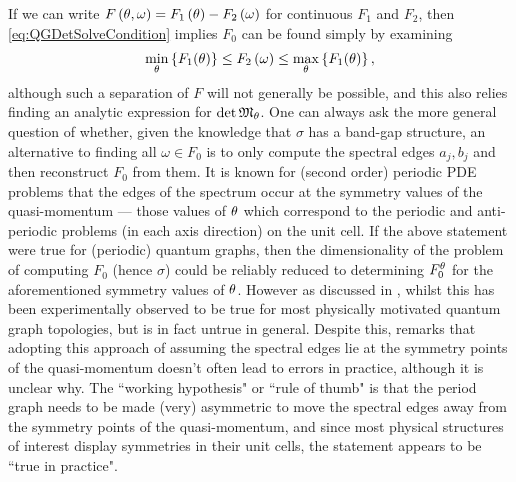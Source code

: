 If we can write $F\left( \theta,\omega \right) = F_1\left( \theta \right) - F_2\left( \omega \right)$ for continuous $F_1$ and $F_2$, then \eqref{eq:QGDetSolveCondition} implies $F_0$ can be found simply by examining
\begin{align*}
	\min_{\theta}\left\{ F_1(\theta) \right\} \leq F_2\left( \omega \right) \leq \max_{\theta}\left\{ F_1(\theta) \right\},
\end{align*} 
although such a separation of $F$ will not generally be possible, and this also relies finding an analytic expression for $\det\mathfrak{M}_\theta$.
One can always ask the more general question of whether, given the knowledge that $\sigma$ has a band-gap structure, an alternative to finding all $\omega\in F_0$ is to only compute the spectral edges $a_j, b_j$ and then reconstruct $F_0$ from them.
It is known for (second order) periodic PDE problems that the edges of the spectrum occur at the symmetry values of the quasi-momentum --- those values of $\theta$ which correspond to the periodic and anti-periodic problems (in each axis direction) on the unit cell.
If the above statement were true for (periodic) quantum graphs, then the dimensionality of the problem of computing $F_0$ (hence $\sigma$) could be reliably reduced to determining $F_0^\theta$ for the aforementioned symmetry values of $\theta$.
However as discussed in \cite[Chapter 4.6]{berkolaiko2013introduction}, whilst this has been experimentally observed to be true for most physically motivated quantum graph topologies, but is in fact untrue in general.
Despite this, \cite[Chapter 4.6]{berkolaiko2013introduction} remarks that adopting this approach of assuming the spectral edges lie at the symmetry points of the quasi-momentum doesn't often lead to errors in practice, although it is unclear why.
The ``working hypothesis" or ``rule of thumb" is that the period graph needs to be made (very) asymmetric to move the spectral edges away from the symmetry points of the quasi-momentum, and since most physical structures of interest display symmetries in their unit cells, the statement appears to be ``true in practice".

